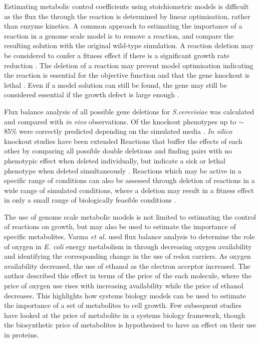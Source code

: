 Estimating metabolic control coefficients using stoichiometric models is difficult as the flux the through the reaction is determined by linear optimisation, rather than enzyme kinetics. A common approach to estimating the importance of a reaction in a genome scale model is to remove a reaction, and compare the resulting solution with the original wild-type simulation. A reaction deletion may be considered to confer a fitness effect if there is a significant growth rate reduction \cite{pal2006}. The deletion of a reaction may prevent model optimisation indicating the reaction is essential for the objective function and that the gene knockout is lethal \cite{becker2008}.  Even if a model solution can still be found, the gene may still be considered essential if the growth defect is large enough \cite{papp2004,wang2009}.

Flux balance analysis of all possible gene deletions for \emph{S.cerevisiae} was calculated and compared with \emph{in vivo} observations. Of the knockout phenotypes up to $\sim$85\% were correctly predicted depending on the simulated media \cite{famili2003,forster2003}. \emph{In silico} knockout studies have been extended Reactions that buffer the effects of each other by comparing all possible double deletions and finding pairs with no phenotypic effect when deleted individually, but indicate a sick or lethal phenotype when deleted simultaneously \cite{harrison2007}. Reactions which may be active in a specific range of conditions can also be assessed through deletion of reactions in a wide range of simulated conditions, where a deletion may result in a fitness effect in only a small range of biologically feasible conditions \cite{papp2004}.

The use of genome scale metabolic models is not limited to estimating the control of reactions on growth, but may also be used to estimate the importance of specific metabolites. Varma \emph{et al.} \cite{varma1993} used flux balance analysis to determine the role of oxygen in \emph{E. coli} energy metabolism in through decreasing oxygen availability and identifying the corresponding change in the use of redox carriers. As oxygen availability decreased, the use of ethanol as the electron acceptor increased. The author described this effect in terms of the price of the each molecule, where the price of oxygen use rises with increasing availability while the price of ethanol decreases. This highlights how systems biology models can be used to estimate the importance of a set of metabolites to cell growth. Few subsequent studies have looked at the price of metabolite in a systems biology framework, though the biosynthetic price of metabolites is hypothesised to have an effect on their use in proteins.

